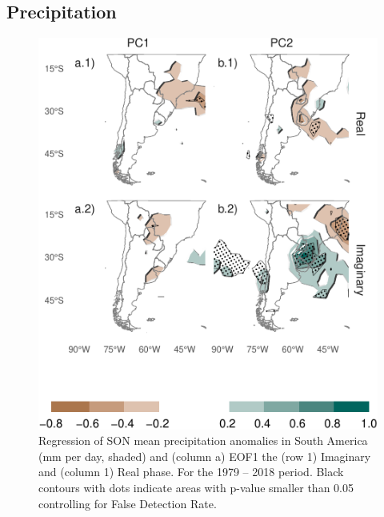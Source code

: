 \documentclass[smallextended]{svjour3}       %
\begin{document}
\hypertarget{precipitation}{%
\subsection{Precipitation}\label{precipitation}}



\begin{figure}
\centering
\includegraphics{../figures/pp-america-1.pdf}
\caption{\label{fig:pp-america}Regression of SON mean precipitation anomalies in South America (mm per day, shaded) and (column a) EOF1 the (row 1) Imaginary and (column 1) Real phase. For the 1979 -- 2018 period. Black contours with dots indicate areas with p-value smaller than 0.05 controlling for False Detection Rate.}
\end{figure}
\end{document}
